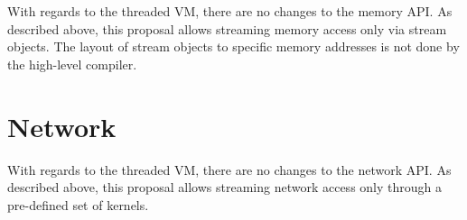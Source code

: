 With regards to the threaded VM, there are no changes to the memory
API.  As described above, this proposal allows streaming memory access
only via stream objects.  The layout of stream objects to specific
memory addresses is not done by the high-level compiler.

\section{Network}

With regards to the threaded VM, there are no changes to the network
API. As described above, this proposal allows streaming network access
only through a pre-defined set of kernels.
